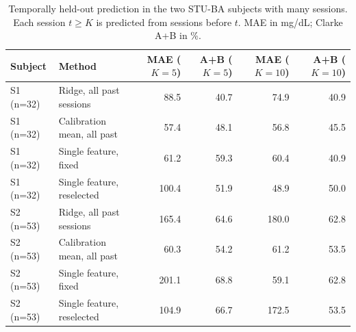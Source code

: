 \begin{table}[htbp]\centering\small
\caption{Temporally held-out prediction in the two STU-BA subjects with many sessions. Each session $t\ge K$ is predicted from sessions before $t$. MAE in mg/dL; Clarke A+B in \%.}\label{tab:s3}
\begin{tabular}{llrrrr}\hline
Subject&Method&MAE ($K=5$)&A+B ($K=5$)&MAE ($K=10$)&A+B ($K=10$)\\\hline
S1 (n=32)&Ridge, all past sessions&88.5&40.7&74.9&40.9\\
S1 (n=32)&Calibration mean, all past&57.4&48.1&56.8&45.5\\
S1 (n=32)&Single feature, fixed&61.2&59.3&60.4&40.9\\
S1 (n=32)&Single feature, reselected&100.4&51.9&48.9&50.0\\
S2 (n=53)&Ridge, all past sessions&165.4&64.6&180.0&62.8\\
S2 (n=53)&Calibration mean, all past&60.3&54.2&61.2&53.5\\
S2 (n=53)&Single feature, fixed&201.1&68.8&59.1&62.8\\
S2 (n=53)&Single feature, reselected&104.9&66.7&172.5&53.5\\
\hline\end{tabular}\end{table}